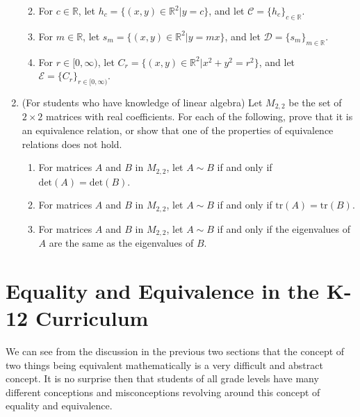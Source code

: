 \documentclass[
]{book}
\providecommand{\tightlist}{%
  \setlength{\itemsep}{0pt}\setlength{\parskip}{0pt}}
\theoremstyle{definition}
\theoremstyle{definition}
\theoremstyle{definition}
\theoremstyle{definition}
\theoremstyle{remark}
\begin{document}
\begin{enumerate}
  \begin{enumerate}
  \def\labelenumii{\alph{enumii}.}
  \tightlist
  \item
    For \(c\in \mathbb{R}\), let \(h_c= \{ (x,y)\in \mathbb{R}^2 \vert y=c\}\), and let \(\mathcal{C} = \{h_c\}_{c\in \mathbb{R}}\).
  \item
    For \(m\in \mathbb{R}\), let \(s_m=\{ (x,y)\in \mathbb{R}^2 \vert y=mx\}\), and let \(\mathcal{D}= \{s_m\}_{m\in \mathbb{R}}\).
  \item
    For \(r\in [0,\infty)\), let \(C_r=\{ (x,y) \in \mathbb{R}^2 \vert x^2+y^2=r^2\}\), and let \(\mathcal{E}=\{C_r\}_{r\in [0,\infty)}\).
  \end{enumerate}
\item
  (For students who have knowledge of linear algebra) Let \(M_{2,2}\) be the set of \(2 \times 2\) matrices with real coefficients. For each of the following, prove that it is an equivalence relation, or show that one of the properties of equivalence relations does not hold.

  \begin{enumerate}
  \def\labelenumii{\alph{enumii}.}
  \tightlist
  \item
    For matrices \(A\) and \(B\) in \(M_{2,2}\), let \(A \sim B\) if and only if \(\mathrm{det}(A)=\mathrm{det}(B)\).
  \item
    For matrices \(A\) and \(B\) in \(M_{2,2}\), let \(A \sim B\) if and only if \(\mathrm{tr}(A)=\mathrm{tr}(B)\).
  \item
    For matrices \(A\) and \(B\) in \(M_{2,2}\), let \(A \sim B\) if and only if the eigenvalues of \(A\) are the same as the eigenvalues of \(B\).
  \end{enumerate}
\end{enumerate}

\hypertarget{equality-and-equivalence-in-the-k-12-curriculum}{%
\section{Equality and Equivalence in the K-12 Curriculum}\label{equality-and-equivalence-in-the-k-12-curriculum}}

We can see from the discussion in the previous two sections that the concept of two things being equivalent mathematically is a very difficult and abstract concept. It is no surprise then that students of all grade levels have many different conceptions and misconceptions revolving around this concept of equality and equivalence.
\end{document}
